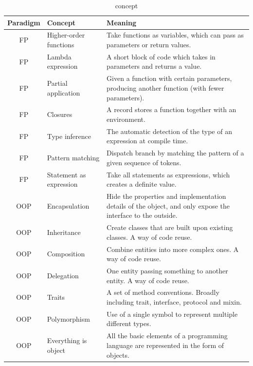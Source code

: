 \begin{table}[ht]
    \caption{concept}
    \label{tab:concept}
    \begin{center}
        \begin{tabular}{cll}
            \toprule
            Paradigm & Concept & Meaning \\
            \midrule
            FP & Higher-order functions & Take functions as variables, which can
            pass as parameters or return values. \\
            FP & Lambda expression & A short block of code which takes in parameters
            and returns a value. \\
            FP & Partial application & Given a function with certain parameters,
            producing another function (with fewer parameters). \\
            FP & Closures & A record stores a function together with an
            environment\cite{sussman1998scheme}. \\
            FP & Type inference & The automatic detection of the type of an
            expression at compile time. \\
            FP & Pattern matching & Dispatch branch by matching the pattern of a
            given sequence of tokens. \\
            FP & Statement as expression & Take all statements as expressions, which
            creates a definite value. \\
            OOP & Encapsulation & Hide the properties and implementation details of
            the object, and only expose the interface to the outside. \\
            OOP & Inheritance & Create classes that are built upon existing
            classes\cite{johnson1988designing}. A way of
            code reuse. \\
            OOP & Composition & Combine entities into more complex ones. A way of
            code reuse. \\
            OOP & Delegation & One entity passing something to another
            entity\cite{wilkinson2009grid}. A way of code
            reuse. \\
            OOP & Traits & A set of method conventions. Broadly including trait,
            interface, protocol and mixin. \\
            OOP & Polymorphism & Use of a single symbol to represent multiple
            different
            types\cite{cardelli1985understanding}. \\
            OOP & Everything is object & All the basic elements of a programming
            language are represented in the form of objects. \\
            \bottomrule
        \end{tabular}
    \end{center}
\end{table}

